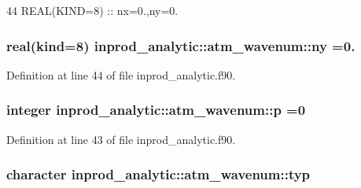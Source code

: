 \begin{DoxyCode}
44      \textcolor{keywordtype}{REAL(KIND=8)} :: nx=0.,ny=0.
\end{DoxyCode}
\subsubsection[{\texorpdfstring{ny}{ny}}]{\setlength{\rightskip}{0pt plus 5cm}real(kind=8) inprod\+\_\+analytic\+::atm\+\_\+wavenum\+::ny =0.\hspace{0.3cm}{\ttfamily [private]}}\hypertarget{structinprod__analytic_1_1atm__wavenum_af75974631175c67689c588f6d92ceb3e}{}\label{structinprod__analytic_1_1atm__wavenum_af75974631175c67689c588f6d92ceb3e}


Definition at line 44 of file inprod\+\_\+analytic.\+f90.

\subsubsection[{\texorpdfstring{p}{p}}]{\setlength{\rightskip}{0pt plus 5cm}integer inprod\+\_\+analytic\+::atm\+\_\+wavenum\+::p =0\hspace{0.3cm}{\ttfamily [private]}}\hypertarget{structinprod__analytic_1_1atm__wavenum_a5a938641d8939931bc4eb71499298a6a}{}\label{structinprod__analytic_1_1atm__wavenum_a5a938641d8939931bc4eb71499298a6a}


Definition at line 43 of file inprod\+\_\+analytic.\+f90.

\subsubsection[{\texorpdfstring{typ}{typ}}]{\setlength{\rightskip}{0pt plus 5cm}character inprod\+\_\+analytic\+::atm\+\_\+wavenum\+::typ\hspace{0.3cm}{\ttfamily [private]}}\hypertarget{structinprod__analytic_1_1atm__wavenum_a1c12be211e96c5a773aae4c2146a3792}{}\label{structinprod__analytic_1_1atm__wavenum_a1c12be211e96c5a773aae4c2146a3792}


